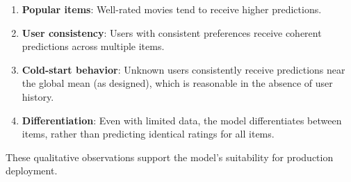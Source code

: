 \begin{enumerate}
  \item \textbf{Popular items}: Well-rated movies tend to receive higher predictions.
  
  \item \textbf{User consistency}: Users with consistent preferences receive coherent predictions 
  across multiple items.
  
  \item \textbf{Cold-start behavior}: Unknown users consistently receive predictions near the global mean 
  (as designed), which is reasonable in the absence of user history.
  
  \item \textbf{Differentiation}: Even with limited data, the model differentiates between items, 
  rather than predicting identical ratings for all items.
\end{enumerate}

These qualitative observations support the model's suitability for production deployment.
